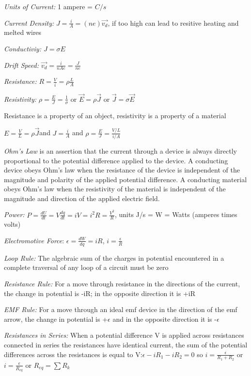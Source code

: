 \documentclass[english]{article}
\begin{document}
\emph{Units of Current:} 1 ampere = $C/s$

\emph{Current Density:} $J=\frac{i}{A}=(ne)\overrightarrow{v_{d}}$,
if too high can lead to resitive heating and melted wires

\emph{Conductiviy: $J=\sigma E$}

\emph{Drift Speed:} $\overrightarrow{v_{d}}=\frac{i}{nAe}=\frac{J}{ne}$

\emph{Resistance:} $R=\frac{V}{i}=\rho\frac{L}{A}$

\emph{Resistivity:} $\rho=\frac{E}{J}=\frac{1}{\sigma}$ or $\overrightarrow{E}=\rho\overrightarrow{J}$
or $\vec{J}=\sigma\overrightarrow{E}$

Resistance is a property of an object, resistivity is a property of
a material

$E=\frac{V}{L}=\rho\overrightarrow{J}$and $J=\frac{i}{A}$ and $\rho=\frac{E}{J}=\frac{V/L}{i/A}$

\emph{Ohm's Law} is an assertion that the current through a device
is always directly proportional to the potential difference applied
to the device. A conducting device obeys Ohm\textquoteright s law
when the resistance of the device is independent of the magnitude
and polarity of the applied potential difference. A conducting material
obeys Ohm\textquoteright s law when the resistivity of the material
is independent of the magnitude and direction of the applied electric
field.

\emph{Power:} $P=\frac{dU}{dt}=V\frac{dq}{dt}=iV=i^{2}R=\frac{V^{2}}{R}$,
units J/s = W = Watts (amperes times volts)

\emph{Electromotive Force}: $\epsilon=\frac{dW}{dq}=iR$, $i=\frac{\epsilon}{R}$

\emph{Loop Rule:} The algebraic sum of the charges in potential encountered
in a complete traversal of any loop of a circuit must be zero

\emph{Resistance Rule:} For a move through resistance in the directions
of the current, the change in potential is -iR; in the opposite direction
it is +iR

\emph{EMF Rule:} For a move through an ideal emf device in the direction
of the emf arrow, the change in potential is +$\epsilon$ and in the
opposite direction it is -$\epsilon$

\emph{Resistances in Series:} When a potential difference V is applied
across resistances connected in series the resistances have identical
current, the sum of the potential differences across the resistances
is equal to V:$\epsilon-iR_{1}-iR_{2}=0$ so $i=\frac{\epsilon}{R_{1}+R_{2}}$
or $i=\frac{\epsilon}{R_{eq}}$ or $R_{eq}=\sum R_{k}$
\end{document}
